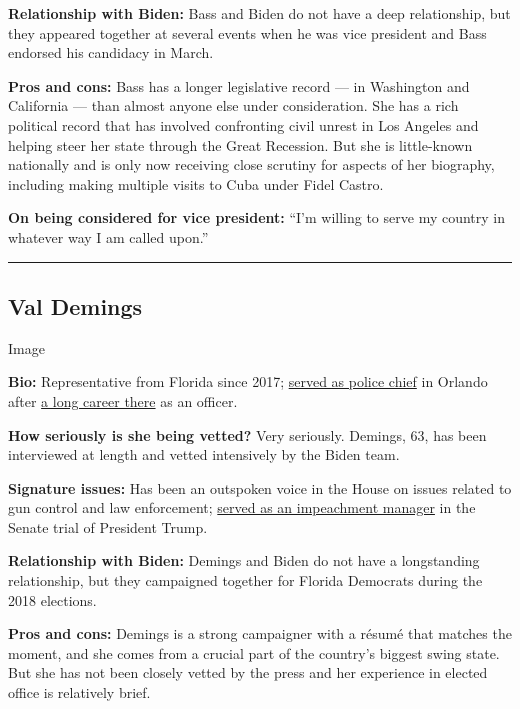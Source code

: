 \textbf{Relationship with Biden:} Bass and Biden do not have a deep
relationship, but they appeared together at several events when he was
vice president and Bass endorsed his candidacy in March.

\textbf{Pros and cons:} Bass has a longer legislative record --- in
Washington and California --- than almost anyone else under
consideration. She has a rich political record that has involved
confronting civil unrest in Los Angeles and helping steer her state
through the Great Recession. But she is little-known nationally and is
only now receiving close scrutiny for aspects of her biography,
including making multiple visits to Cuba under Fidel Castro.

\textbf{On being considered for vice president:} ``I'm willing to serve
my country in whatever way I am called upon.''

\begin{center}\rule{0.5\linewidth}{\linethickness}\end{center}

\hypertarget{val-demings}{%
\subsection{Val Demings}\label{val-demings}}

Image

\textbf{Bio:} Representative from Florida since 2017;
\href{https://www.nytimes.com/2020/01/15/us/politics/who-is-val-demings.html}{served
as police chief} in Orlando after
\href{https://www.nytimes.com/article/val-demings-biden-vp.html}{a long
career there} as an officer.

\textbf{How seriously is she being vetted?} Very seriously. Demings, 63,
has been interviewed at length and vetted intensively by the Biden team.

\textbf{Signature issues:} Has been an outspoken voice in the House on
issues related to gun control and law enforcement;
\href{https://www.nytimes.com/2020/01/15/us/politics/impeachment-briefing-meet-the-managers.html}{served
as an impeachment manager} in the Senate trial of President Trump.

\textbf{Relationship with Biden:} Demings and Biden do not have a
longstanding relationship, but they campaigned together for Florida
Democrats during the 2018 elections.

\textbf{Pros and cons:} Demings is a strong campaigner with a résumé
that matches the moment, and she comes from a crucial part of the
country's biggest swing state. But she has not been closely vetted by
the press and her experience in elected office is relatively brief.

